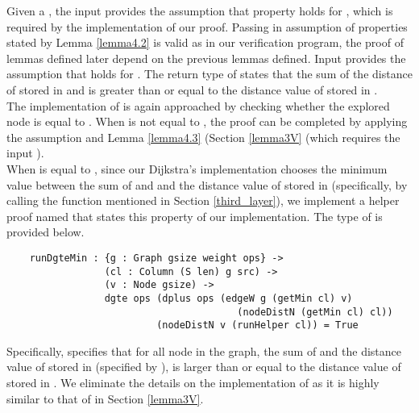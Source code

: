 Given a , the input  provides the assumption that property  holds for , which is required by the implementation of our proof. Passing in assumption of properties stated by Lemma \ref{lemma4.2} is valid as in our verification program, the proof of lemmas defined later depend on the previous lemmas defined. Input  provides the assumption that  holds for . The return type of  states that the sum of the distance of  stored in  and  is greater than or equal to the distance value of  stored in . 
\\

The implementation of  is again approached by checking whether the explored node  is equal to . When  is not equal to , the proof can be completed by applying the assumption  and Lemma \ref{lemma4.3}  (Section \ref{lemma3V} (which requires the input ). 
\\

When  is equal to , since our Dijkstra's implementation chooses the minimum value between the sum of  and  and the distance value of  stored in  (specifically, by calling the  function mentioned in Section \ref{third_layer}), we implement a helper proof named  that states this property of our implementation. The type of  is provided below. 
\begin{lstlisting}
	runDgteMin : {g : Graph gsize weight ops} ->
	             (cl : Column (S len) g src) ->
	             (v : Node gsize) ->
	             dgte ops (dplus ops (edgeW g (getMin cl) v) 
	             					 	(nodeDistN (getMin cl) cl))
	                      (nodeDistN v (runHelper cl)) = True
\end{lstlisting}

Specifically,  specifies that for all node  in the graph, the sum of  and the distance value of  stored in (specified by ), is larger than or equal to the distance value of  stored in . We eliminate the details on the implementation of  as it is highly similar to that of  in Section \ref{lemma3V}. 
\\

